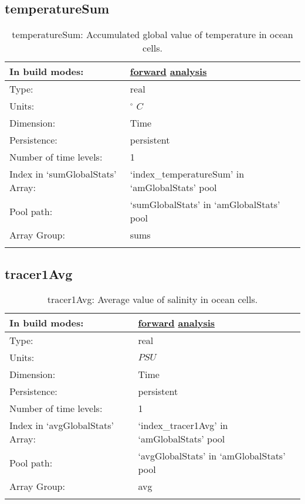 \subsection[temperatureSum]{temperatureSum}
\label{subsec:var_sec_amGlobalStats_temperatureSum}
\begin{center}
\begin{longtable}{| p{2.0in} | p{4.0in} |}
        \hline 
        In build modes: & \hyperref[subsec:forward_var_tab_amGlobalStats]{forward} \hyperref[subsec:analysis_var_tab_amGlobalStats]{analysis} \\
        \hline 
        Type: & real \\
        \hline 
        Units: & $^\circ$ $C$ \\
        \hline 
        Dimension: & Time \\
        \hline 
        Persistence: & persistent \\
        \hline 
        Number of time levels: & 1 \\
        \hline 
		 Index in `sumGlobalStats' Array: & `index\_temperatureSum' in `amGlobalStats' pool \\
		 \hline 
            Pool path: & `sumGlobalStats' in `amGlobalStats' pool \\
		 \hline 
		 Array Group: & sums \\
		 \hline 
    \caption{temperatureSum: Accumulated global value of temperature in ocean cells.}
\end{longtable}
\end{center}
\subsection[tracer1Avg]{tracer1Avg}
\label{subsec:var_sec_amGlobalStats_tracer1Avg}
\begin{center}
\begin{longtable}{| p{2.0in} | p{4.0in} |}
        \hline 
        In build modes: & \hyperref[subsec:forward_var_tab_amGlobalStats]{forward} \hyperref[subsec:analysis_var_tab_amGlobalStats]{analysis} \\
        \hline 
        Type: & real \\
        \hline 
        Units: & $PSU$ \\
        \hline 
        Dimension: & Time \\
        \hline 
        Persistence: & persistent \\
        \hline 
        Number of time levels: & 1 \\
        \hline 
		 Index in `avgGlobalStats' Array: & `index\_tracer1Avg' in `amGlobalStats' pool \\
		 \hline 
            Pool path: & `avgGlobalStats' in `amGlobalStats' pool \\
		 \hline 
		 Array Group: & avg \\
		 \hline 
    \caption{tracer1Avg: Average value of salinity in ocean cells.}
\end{longtable}
\end{center}
